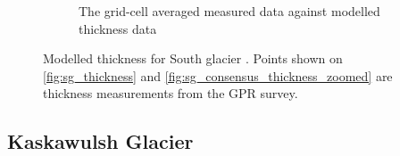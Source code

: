 \documentclass[a4, 12pt]{article}
\begin{document}
\begin{figure}[h!]
{\begin{subfigure}{0.6\linewidth}
\caption{The grid-cell averaged measured data against modelled thickness data}
\label{fig:xy_sg_thickness}
\end{subfigure}
}
\caption{Modelled thickness for South glacier \citep{farinotti2019consensus}. Points shown on \ref{fig:sg_thickness} and \ref{fig:sg_consensus_thickness_zoomed} are thickness measurements from the GPR survey.}
\end{figure}
\FloatBarrier

\subsection{Kaskawulsh Glacier}
\end{document}
